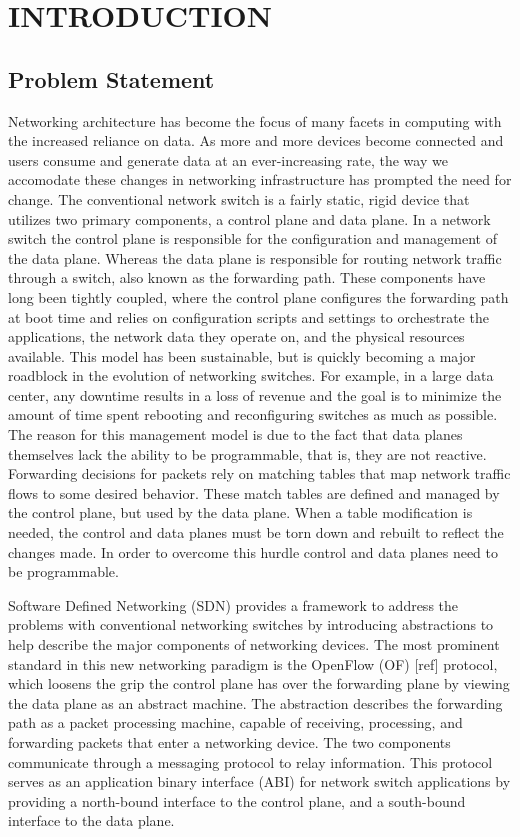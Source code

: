 \chapter{INTRODUCTION}
\label{intro}

\section{Problem Statement}

Networking architecture has become the focus of many facets in computing
with the increased reliance on data. As more and more devices become connected
and users consume and generate data at an ever-increasing rate, the way we
accomodate these changes in networking infrastructure has prompted the need
for change. The conventional network switch is a fairly static, rigid device
that utilizes two primary components, a control plane and data plane. In a
network switch the control plane is responsible for the configuration and
management of the data plane. Whereas the data plane is responsible for routing
network traffic through a switch, also known as the forwarding path. These
components have long been tightly coupled, where the control plane configures 
the forwarding path at boot time and relies on configuration scripts and
settings to orchestrate the applications, the network data they operate on, 
and the physical resources available. This model has been sustainable, but is 
quickly becoming a major roadblock in the evolution of networking switches. 
For example, in a large data center, any downtime results in a loss of revenue 
and the goal is to minimize the amount of time spent rebooting and
reconfiguring switches as much as possible. The reason for this management
model is due to the fact that data planes themselves lack the ability to be
programmable, that is, they are not reactive. Forwarding decisions for packets
rely on matching tables that map network traffic flows to some desired 
behavior. These match tables are defined and managed by the control plane, but
used by the data plane. When a table modification is needed, the control and
data planes must be torn down and rebuilt to reflect the changes made. In
order to overcome this hurdle control and data planes need to be programmable.

Software Defined Networking (SDN) provides a framework to address the
problems with conventional networking switches by introducing abstractions
to help describe the major components of networking devices. The most prominent
standard in this new networking paradigm is the OpenFlow (OF) [ref] protocol,
which loosens the grip the control plane has over the forwarding plane by 
viewing the data plane as an abstract machine. The abstraction describes the 
forwarding path as a packet processing machine, capable of receiving,
processing, and forwarding packets that enter a networking device. The two 
components communicate through a messaging protocol to relay information. This
protocol serves as an application binary interface (ABI) for network switch 
applications by providing a north-bound interface to the control plane, and a 
south-bound interface to the data plane.

